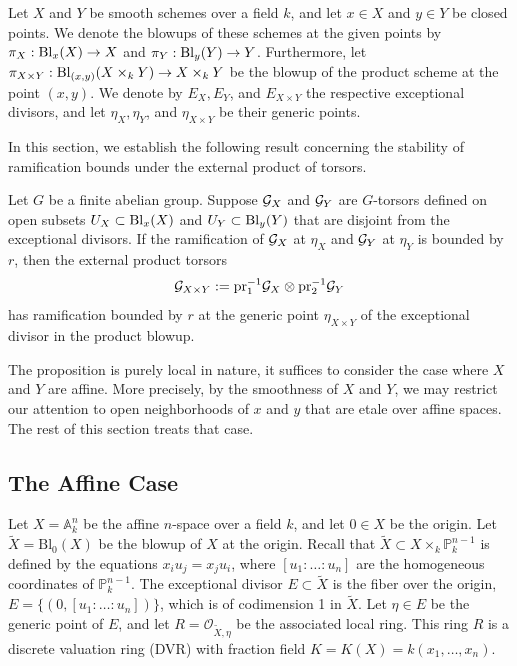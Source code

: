 
Let $X$ and $Y$ be smooth schemes over a field $k$, and let $x \in X$ and $y \in Y$ be closed points. 
We denote the blowups of these schemes at the given points by 
$\pi_X: \operatorname{Bl}_x(X) \to X$ and $\pi_Y: \operatorname{Bl}_y(Y) \to Y$. Furthermore, let $\pi_{X \times Y}: \operatorname{Bl}_{(x,y)}(X \times_k Y) \to X \times_k Y$ 
be the blowup of the product scheme at the point $(x,y)$.
We denote by $E_X, E_Y$, and $E_{X \times Y}$ the respective exceptional divisors, and let $\eta_X, \eta_Y$, and $\eta_{X \times Y}$ be their generic points.

In this section, we establish the following result concerning the stability of ramification bounds under the external product of torsors.

\begin{prop}\label{prop:ramification-external-product:reorg}
Let $G$ be a finite abelian group. Suppose $\mathcal{G}_X$ and $\mathcal{G}_Y$ are $G$-torsors defined on open subsets $U_X \subset \operatorname{Bl}_x(X)$ and $U_Y \subset \operatorname{Bl}_y(Y)$ that are disjoint 
from the exceptional divisors. 
If the ramification of $\mathcal{G}_X$ at $\eta_X$ and $\mathcal{G}_Y$ at $\eta_Y$ is bounded by $r$, then the external product torsors 
\[
\mathcal{G}_{X \times Y} := \text{pr}_1^{-1} \mathcal{G}_X \otimes \text{pr}_2^{-1} \mathcal{G}_Y
\]
has ramification bounded by $r$ at the generic point $\eta_{X\times Y}$ of the exceptional divisor in the product blowup.
\end{prop}

The proposition is purely local in nature, it suffices to consider the case where $X$ and $Y$ are affine. 
More precisely, by the smoothness of $X$ and $Y$, we may restrict our attention to open neighborhoods of $x$ and $y$ that are etale over affine spaces. 
The rest of this section treats that case.

\subsection*{The Affine Case}
Let $X = \mathbb{A}_k^n$ be the affine $n$-space over a field $k$, and let $0 \in X$ be the origin. 
Let $\tilde{X} = \text{Bl}_0(X)$ be the blowup of $X$ at the origin. 
Recall that $\tilde{X} \subset X \times_k \mathbb{P}^{n-1}_k$ is defined by the equations $x_i u_j = x_j u_i$, where $[u_1 : \dots : u_n]$ are the homogeneous coordinates of 
$\mathbb{P}^{n-1}_k$.
The exceptional divisor $E \subset \tilde{X}$ is the fiber over the origin, $E = \{ (0, [u_1 : \dots : u_n]) \}$, which is of codimension 1 in $\tilde{X}$. 
Let $\eta \in E$ be the generic point of $E$, and let $R = \mathcal{O}_{\tilde{X}, \eta}$ be the associated local ring. 
This ring $R$ is a discrete valuation ring (DVR) with fraction field $K = K(X) = k(x_1, \dots, x_n)$.

